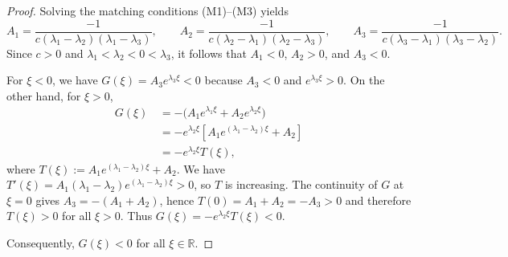 \documentclass[12pt,letterpaper]{amsart}
\theoremstyle{definition}
\theoremstyle{remark}
\numberwithin{equation}{section}
\begin{document}
  \begin{proof}
  	Solving the matching conditions (M1)--(M3) yields
  	\[
  	A_1=\frac{-1}{c(\lambda_1-\lambda_2)(\lambda_1-\lambda_3)},\qquad
  	A_2=\frac{-1}{c(\lambda_2-\lambda_1)(\lambda_2-\lambda_3)},\qquad
  	A_3=\frac{-1}{c(\lambda_3-\lambda_1)(\lambda_3-\lambda_2)}.
  	\]
  	Since $c>0$ and $\lambda_1<\lambda_2<0<\lambda_3$, it follows that
  	$A_1<0$, $A_2>0$, and $A_3<0$.
  	
  	For $\xi<0$, we have $G(\xi)=A_3 e^{\lambda_3\xi}<0$ because $A_3<0$ and $e^{\lambda_3\xi}>0$.
 On the other hand,  
    	for $\xi>0$, 
  	\begin{align*}
G(\xi) &\, = - \bigl(A_1 e^{\lambda_1\xi}+A_2 e^{\lambda_2\xi}\bigr)\\
  		&\, =  -e^{\lambda_2\xi}[A_1 e^{(\lambda_1-\lambda_2)\xi}+A_2]\\
  		& \, =-e^{\lambda_2\xi}T(\xi),		
  	\end{align*}
  	where $T(\xi):=A_1 e^{(\lambda_1-\lambda_2)\xi}+A_2$.
  	We have $T'(\xi)=A_1(\lambda_1-\lambda_2)e^{(\lambda_1-\lambda_2)\xi}>0$, so $T$ is increasing.
  	The continuity of $G$ at $\xi=0$ gives $A_3=-(A_1+A_2)$, hence
  	$T(0)=A_1+A_2=-A_3>0$ and therefore $T(\xi)>0$ for all $\xi>0$.
  	Thus $G(\xi)=-e^{\lambda_2\xi}T(\xi)<0$.
  	
  	Consequently, $G(\xi)<0$ for all $\xi\in\mathbb{R}$.
  \end{proof}
 
\end{document}
